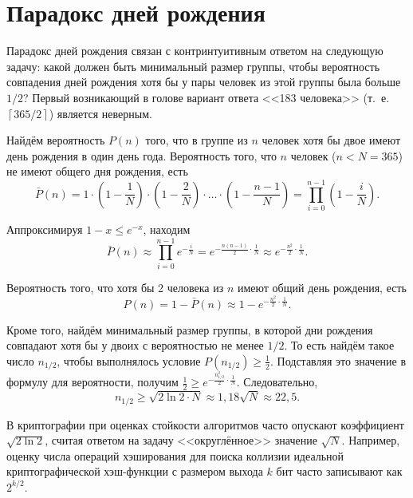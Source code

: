 \section{Парадокс дней рождения}\label{section-birthday-padradox}

Парадокс дней рождения связан с контринтуитивным ответом на следующую задачу: какой должен быть минимальный размер группы, чтобы вероятность совпадения дней рождения хотя бы у пары человек из этой группы была больше $1 / 2$? Первый возникающий в голове вариант ответа <<183 человека>> (т.~е. $\left\lceil 365 / 2 \right\rceil$) является неверным.

Найдём вероятность $P(n)$ того, что в группе из $n$ человек хотя бы двое имеют день рождения в один день года. Вероятность того, что $n$ человек ($n < N = 365$) не имеют общего дня рождения, есть
\[
    \bar{P}(n) = 1 \cdot \left( 1 - \frac{1}{N} \right) \cdot \left(1 - \frac{2}{N} \right)\cdot \dots \cdot  \left( 1 - \frac{n-1}{N} \right) = \prod\limits_{i=0}^{n-1} \left( 1 - \frac{i}{N} \right).
\]

Аппроксимируя $1-x \leq e^{-x}$, находим
    \[ \bar{P}(n) \approx \prod\limits_{i=0}^{n-1} e^{-\frac{i}{N}} = e^{-\frac{n(n-1)}{2} \cdot \frac{1}{N}} \approx e^{-\frac{n^2}{2} \cdot \frac{1}{N}}. \]

Вероятность того, что хотя бы 2 человека из $n$ имеют общий день рождения, есть
    \[ P(n) = 1 - \bar{P}(n) \approx 1 -  e^{-\frac{n^2}{2} \cdot \frac{1}{N}}. \]

Кроме того, найдём минимальный размер группы, в которой дни рождения совпадают хотя бы у двоих с вероятностью не менее $1/2$. То есть найдём такое число $n_{1/2}$, чтобы выполнялось условие $P(n_{1/2}) \geq \frac{1}{2}$. Подставляя это значение в формулу для вероятности, получим $\frac{1}{2} \geq e^{-\frac{n_{1/2}^2}{2} \cdot \frac{1}{N}}$. Следовательно,
	\[n_{1/2} \geq \sqrt{2 \ln 2 \cdot N} \approx 1,18 \sqrt{ N } \approx 22,5.\]

В криптографии при оценках стойкости алгоритмов часто опускают коэффициент $\sqrt{2 \ln 2}$, считая ответом на задачу <<округлённое>> значение $\sqrt{ N }$. Например, оценку числа операций хэширования для поиска коллизии идеальной криптографической хэш-функции с размером выхода $k$ бит часто записывают как $2^{k/2}$.
